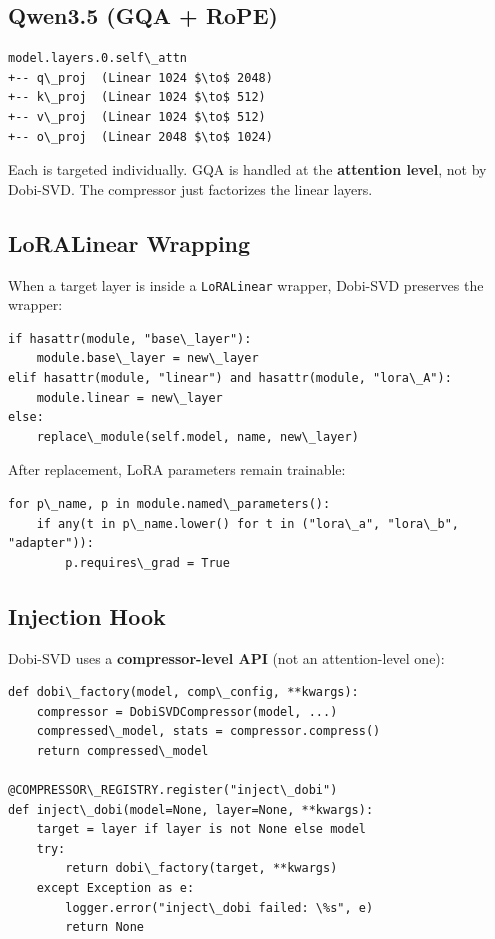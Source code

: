 \subsection{Qwen3.5 (GQA + RoPE)}

\begin{lstlisting}
model.layers.0.self\_attn
+-- q\_proj  (Linear 1024 $\to$ 2048)
+-- k\_proj  (Linear 1024 $\to$ 512)
+-- v\_proj  (Linear 1024 $\to$ 512)
+-- o\_proj  (Linear 2048 $\to$ 1024)
\end{lstlisting}

Each is targeted individually. GQA is handled at the \textbf{attention level}, 
not by Dobi-SVD. The compressor just factorizes the linear layers.

\subsection{LoRALinear Wrapping}

When a target layer is inside a \texttt{LoRALinear} wrapper, Dobi-SVD preserves 
the wrapper:

\begin{lstlisting}
if hasattr(module, "base\_layer"):
    module.base\_layer = new\_layer
elif hasattr(module, "linear") and hasattr(module, "lora\_A"):
    module.linear = new\_layer
else:
    replace\_module(self.model, name, new\_layer)
\end{lstlisting}

After replacement, LoRA parameters remain trainable:

\begin{lstlisting}
for p\_name, p in module.named\_parameters():
    if any(t in p\_name.lower() for t in ("lora\_a", "lora\_b", "adapter")):
        p.requires\_grad = True
\end{lstlisting}

\subsection{Injection Hook}

Dobi-SVD uses a \textbf{compressor-level API} (not an attention-level one):

\begin{lstlisting}
def dobi\_factory(model, comp\_config, **kwargs):
    compressor = DobiSVDCompressor(model, ...)
    compressed\_model, stats = compressor.compress()
    return compressed\_model

@COMPRESSOR\_REGISTRY.register("inject\_dobi")
def inject\_dobi(model=None, layer=None, **kwargs):
    target = layer if layer is not None else model
    try:
        return dobi\_factory(target, **kwargs)
    except Exception as e:
        logger.error("inject\_dobi failed: \%s", e)
        return None
\end{lstlisting}

